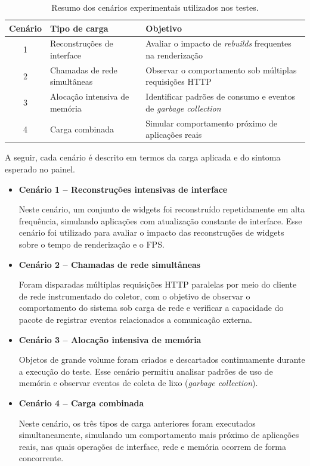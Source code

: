 \begin{table}[htbp]
\centering
\caption{Resumo dos cenários experimentais utilizados nos testes.}
\label{tab:cenarios-experimentais}
\small
\renewcommand{\arraystretch}{1.2}
\begin{tabular}{|c|p{4cm}|p{6cm}|}
\hline
\textbf{Cenário} & \textbf{Tipo de carga} & \textbf{Objetivo} \\
\hline
1 & Reconstruções de interface & Avaliar o impacto de \textit{rebuilds} frequentes na renderização \\
\hline
2 & Chamadas de rede simultâneas & Observar o comportamento sob múltiplas requisições HTTP \\
\hline
3 & Alocação intensiva de memória & Identificar padrões de consumo e eventos de \textit{garbage collection} \\
\hline
4 & Carga combinada & Simular comportamento próximo de aplicações reais \\
\hline
\end{tabular}
\end{table}

A seguir, cada cenário é descrito em termos da carga aplicada e do sintoma esperado no painel.

\begin{itemize}

\item \textbf{Cenário 1 – Reconstruções intensivas de interface}

Neste cenário, um conjunto de widgets foi reconstruído repetidamente em alta frequência, simulando aplicações com atualização constante de interface. Esse cenário foi utilizado para avaliar o impacto das reconstruções de widgets sobre o tempo de renderização e o FPS.

\item \textbf{Cenário 2 – Chamadas de rede simultâneas}

Foram disparadas múltiplas requisições HTTP paralelas por meio do cliente de rede instrumentado do coletor, com o objetivo de observar o comportamento do sistema sob carga de rede e verificar a capacidade do pacote de registrar eventos relacionados a comunicação externa.

\item \textbf{Cenário 3 – Alocação intensiva de memória}

Objetos de grande volume foram criados e descartados continuamente durante a execução do teste. Esse cenário permitiu analisar padrões de uso de memória e observar eventos de coleta de lixo (\textit{garbage collection}).

\item \textbf{Cenário 4 – Carga combinada}

Neste cenário, os três tipos de carga anteriores foram executados simultaneamente, simulando um comportamento mais próximo de aplicações reais, nas quais operações de interface, rede e memória ocorrem de forma concorrente.

\end{itemize}


